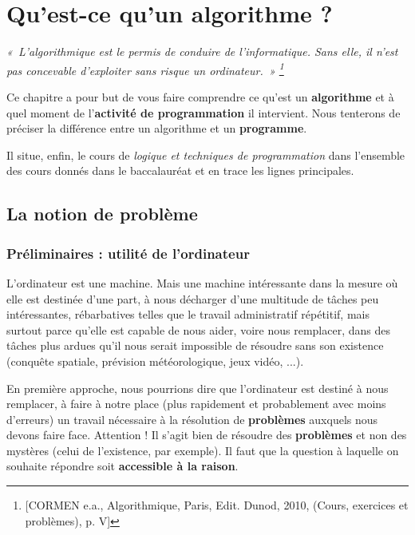 \chapter{Qu'est-ce qu'un algorithme ?}

\begin{center}
	\textit{«~L'algorithmique est le permis de conduire de l'informatique.
	Sans elle, il n'est pas concevable d'exploiter sans risque un ordinateur.~»
	\footnote{[CORMEN e.a., Algorithmique, Paris, Edit. Dunod, 2010, (Cours, 
	exercices et problèmes), p. V] }}
\end{center}

Ce chapitre a pour but de vous faire comprendre ce
qu'est un \textbf{algorithme} et à quel moment de
l'\textbf{activité de programmation} il intervient. 
Nous tenterons de préciser la différence entre un algorithme 
et un \textbf{programme}.

Il situe, enfin, le cours de \textit{logique et techniques de
programmation} dans l’ensemble des cours donnés dans le baccalauréat et
en trace les lignes principales.

\section{La notion de problème}

	\subsection{Préliminaires : utilité de l’ordinateur}
	
		L’ordinateur est une machine. Mais une machine intéressante dans la
		mesure où elle est destinée d’une part, à nous décharger d’une
		multitude de tâches peu intéressantes, rébarbatives telles que le
		travail administratif répétitif, mais surtout parce qu’elle est capable
		de nous aider, voire nous remplacer, dans des tâches plus ardues qu’il
		nous serait impossible de résoudre sans son existence (conquête
		spatiale, prévision météorologique, jeux vidéo, ...).
		
		En première approche, nous pourrions dire que l’ordinateur est destiné à
		nous remplacer, à faire à notre place (plus rapidement et probablement
		avec moins d’erreurs) un travail nécessaire à la résolution de
		\textbf{problèmes} auxquels nous devons faire face. Attention ! Il
		s’agit bien de résoudre des \textbf{problèmes} et non des mystères
		(celui de l’existence, par exemple). Il faut que la question à laquelle
		on souhaite répondre soit \textbf{accessible à la raison}.

